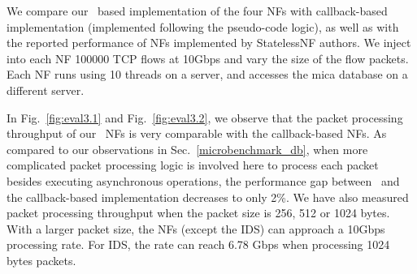 We compare our \netstar~based implementation of the four NFs with callback-based implementation (implemented following the pseudo-code logic), %
as well as with the reported performance of NFs implemented by StatelessNF authors. We inject into each NF 100000 TCP flows at 10Gbps and vary the size of the flow packets. Each NF runs using 10 threads on a server, and accesses the mica database on a different server. %





In Fig.~\ref{fig:eval3.1} and Fig.~\ref{fig:eval3.2}, we observe that the packet processing throughput of our \netstar~NFs is very comparable with the callback-based NFs. %
As compared to our observations in Sec.~\ref{microbenchmark_db}, when more complicated packet processing logic is involved here to process each packet besides executing asynchronous operations, the performance gap between \netstar~and the callback-based implementation decreases to only 2\%. We have also measured packet processing throughput when the packet size is 256, 512 or 1024 bytes. With a larger packet size, the NFs (except the IDS) can approach a 10Gbps processing rate. For IDS, the rate can reach 6.78 Gbps when processing 1024 bytes packets.

